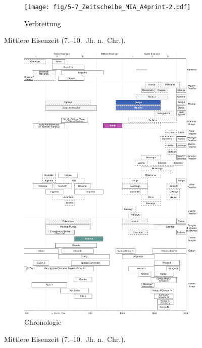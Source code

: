 \begin{figure}[p]
	\centering
	\begin{subfigure}[b]{\textwidth}
		\centering
		\texttt{[image: fig/5-7\_Zeitscheibe\_MIA\_A4print-2.pdf]}
		\vspace{4cm}
		\caption{Verbreitung}
		\label{fig:MIA_Karte}
	\end{subfigure}
	\caption{Mittlere Eisenzeit (7.--10.~Jh. n.~Chr.).}
	\label{}
\end{figure}
\addtocounter{figure}{-1}
\begin{figure}[p]
	\begin{subfigure}[b]{\textwidth}
		\setcounter{subfigure}{1}
		\centering
		\includegraphics[height = .9\textheight]{fig/Chronologiesystem_v4_Zeitscheibe_MIA.pdf}
		\caption{Chronologie}
		\label{fig:MIA_Chronologie}
	\end{subfigure}
	\caption{Mittlere Eisenzeit (7.--10.~Jh. n.~Chr.).}
	\label{fig:MIA}
\end{figure}

